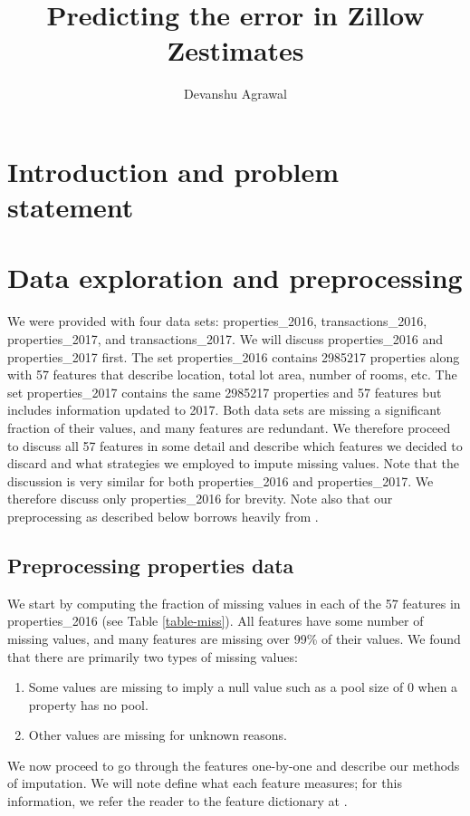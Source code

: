 \documentclass[12pt]{article}
\title{Predicting the error in Zillow Zestimates}
\author{Devanshu Agrawal}
\date{}
\begin{document}
\maketitle

\section{Introduction and problem statement}

\section{Data exploration and preprocessing}

We were provided with four data sets: properties\_2016, transactions\_2016, properties\_2017, and transactions\_2017. We will discuss properties\_2016 and properties\_2017 first. The set properties\_2016 contains 2985217 properties along with 57 features that describe location, total lot area, number of rooms, etc. The set properties\_2017 contains the same 2985217 properties and 57 features but includes information updated to 2017. Both data sets are missing a significant fraction of their values, and many features are redundant. We therefore proceed to discuss all 57 features in some detail and describe which features we decided to discard and what strategies we employed to impute missing values. Note that the discussion is very similar for both properties\_2016 and properties\_2017. We therefore discuss only properties\_2016 for brevity. Note also that our preprocessing as described below borrows heavily from \cite{rtlatimer}.

\subsection{Preprocessing properties data}

We start by computing the fraction of missing values in each of the 57 features in properties\_2016 (see Table \ref{table-miss}). All features have some number of missing values, and many features are missing over 99\% of their values. We found that there are primarily two types of missing values:
\begin{enumerate}
\item Some values are missing to imply a null value such as a pool size of $0$ when a property has no pool.
\item Other values are missing for unknown reasons.
\end{enumerate}
We now proceed to go through the features one-by-one and describe our methods of imputation. We will note define what each feature measures; for this information, we refer the reader to the feature dictionary at \cite{kaggle}.
\end{document}
